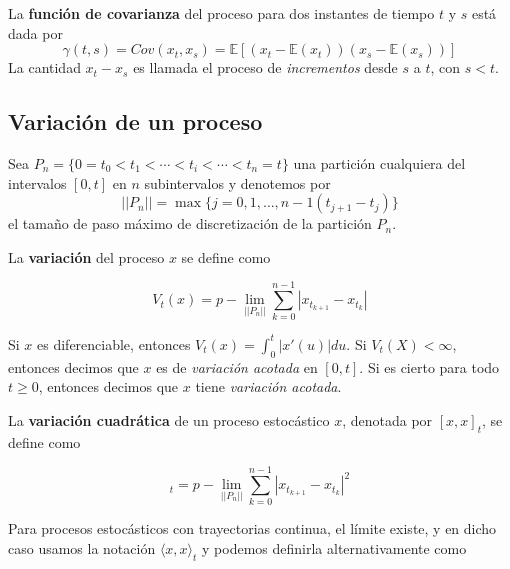 \documentclass[12pt,]{krantz}
\theoremstyle{definition}
\theoremstyle{definition}
\theoremstyle{definition}
\theoremstyle{remark}
\let\BeginKnitrBlock\begin \let\EndKnitrBlock\end
\begin{document}
\BeginKnitrBlock{definition}
\protect\hypertarget{def:defi-funcion-covarianza-proceso}{}{\label{def:defi-funcion-covarianza-proceso}
}La \textbf{función de covarianza} del proceso para dos instantes de
tiempo \(t\) y \(s\) está dada por
\[\gamma(t,s)=Cov(x_t,x_s)=\mathbb{E}[(x_t-\mathbb{E}(x_t))(x_s-\mathbb{E}(x_s))]\]
La cantidad \(x_t-x_s\) es llamada el proceso de \emph{incrementos}
desde \(s\) a \(t\), con \(s<t\).
\EndKnitrBlock{definition}

\subsection{Variación de un proceso}\label{variacion-de-un-proceso}

Sea \(P_n=\{0=t_0<t_1<\cdots<t_i<\cdots<t_n=t\}\) una partición
cualquiera del intervalos \([0,t]\) en \(n\) subintervalos y denotemos
por \[||P_n||=\max\{j=0,1,\ldots,n-1(t_{j+1}-t_j)\}\] el tamaño de paso
máximo de discretización de la partición \(P_n\).

\BeginKnitrBlock{definition}
\protect\hypertarget{def:defi-variacion-proceso}{}{\label{def:defi-variacion-proceso}
}La \textbf{variación} del proceso \(x\) se define como

\begin{equation}
V_t(x)=p-\lim_{||P_n||}\sum_{k=0}^{n-1}|x_{t_{k+1}}-x_{t_k}|
\label{eq:eq-variacion-proceso}
\end{equation}

Si \(x\) es diferenciable, entonces \(V_t(x)=\int_0^t|x'(u)|du\). Si
\(V_t(X)<\infty\), entonces decimos que \(x\) es de \emph{variación
acotada} en \([0,t]\). Si es cierto para todo \(t\geq0\), entonces
decimos que \(x\) tiene \emph{variación acotada}.
\EndKnitrBlock{definition}

\BeginKnitrBlock{definition}
\protect\hypertarget{def:defi-variacion-acotada}{}{\label{def:defi-variacion-acotada}
}La \textbf{variación cuadrática} de un proceso estocástico \(x\),
denotada por \([x,x]_t\), se define como

\begin{equation}
[x,x]_t = p-\lim_{||P_n||}\sum_{k=0}^{n-1}|x_{t_{k+1}}-x_{t_k}|^2
\label{eq:eq-variacion-acotada-proceso}
\end{equation}
\EndKnitrBlock{definition}

Para procesos estocásticos con trayectorias continua, el límite existe,
y en dicho caso usamos la notación \(\langle x,x\rangle_t\) y podemos
definirla alternativamente como
\end{document}
